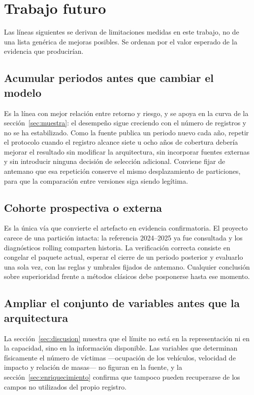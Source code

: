 \section{Trabajo futuro}\label{sec:futuro}

Las líneas siguientes se derivan de limitaciones medidas en este trabajo, no de una lista genérica de mejoras posibles. Se ordenan por el valor esperado de la evidencia que producirían.

\subsection{Acumular periodos antes que cambiar el modelo}
Es la línea con mejor relación entre retorno y riesgo, y se apoya en la curva de la sección~\ref{sec:muestra}: el desempeño sigue creciendo con el número de registros y no se ha estabilizado. Como la fuente publica un periodo nuevo cada año, repetir el protocolo cuando el registro alcance siete u ocho años de cobertura debería mejorar el resultado sin modificar la arquitectura, sin incorporar fuentes externas y sin introducir ninguna decisión de selección adicional. Conviene fijar de antemano que esa repetición conserve el mismo desplazamiento de particiones, para que la comparación entre versiones siga siendo legítima.

\subsection{Cohorte prospectiva o externa}
Es la única vía que convierte el artefacto en evidencia confirmatoria. El proyecto carece de una partición intacta: la referencia 2024--2025 ya fue consultada y los diagnósticos rolling comparten historia. La verificación correcta consiste en congelar el paquete actual, esperar el cierre de un periodo posterior y evaluarlo una sola vez, con las reglas y umbrales fijados de antemano. Cualquier conclusión sobre superioridad frente a métodos clásicos debe posponerse hasta ese momento.

\subsection{Ampliar el conjunto de variables antes que la arquitectura}
La sección~\ref{sec:discusion} muestra que el límite no está en la representación ni en la capacidad, sino en la información disponible. Las variables que determinan físicamente el número de víctimas ---ocupación de los vehículos, velocidad de impacto y relación de masas--- no figuran en la fuente, y la sección~\ref{sec:enriquecimiento} confirma que tampoco pueden recuperarse de los campos no utilizados del propio registro.

